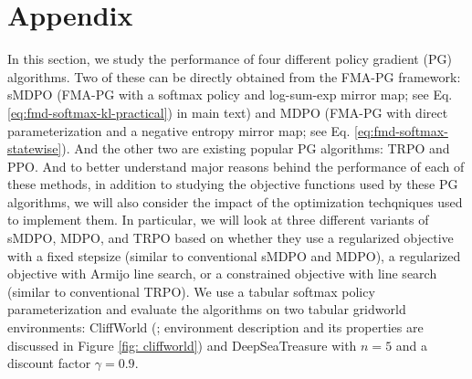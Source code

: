 \documentclass[a4paper, 10pt]{article}
\begin{document}
\section{Appendix} \label{app:tabular_experiments}
In this section, we study the performance of four different policy gradient (PG) algorithms. Two of these can be directly obtained from the FMA-PG framework: sMDPO (FMA-PG with a softmax policy and log-sum-exp mirror map; see Eq. \ref{eq:fmd-softmax-kl-practical}) in main text) and MDPO (FMA-PG with direct parameterization and a negative entropy mirror map; see Eq. \ref{eq:fmd-softmax-statewise}). And the other two are existing popular PG algorithms: TRPO and PPO. And to better understand major reasons behind the performance of each of these methods, in addition to studying the objective functions used by these PG algorithms, we will also consider the impact of the optimization techqniques used to implement them. In particular, we will look at three different variants of sMDPO, MDPO, and TRPO based on whether they use a regularized objective with a fixed stepsize (similar to conventional sMDPO and MDPO), a regularized objective with Armijo line search, or a constrained objective with line search (similar to conventional TRPO). We use a tabular softmax policy parameterization and evaluate the algorithms on two tabular gridworld environments: CliffWorld (\citep{sutton18book}; environment description and its properties are discussed in Figure \ref{fig: cliffworld}) and DeepSeaTreasure \citep{osband2019behaviour} with $n=5$ and a discount factor $\gamma=0.9$. 
\end{document}
